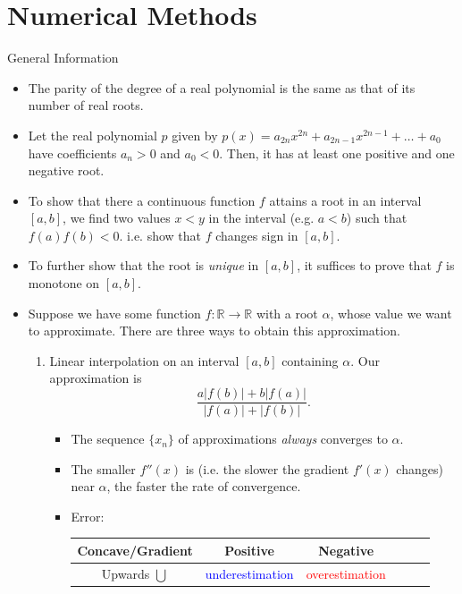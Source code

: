 \documentclass[../Notes.tex]{subfiles}
\begin{document}
\chapter{Numerical Methods}
\begin{stbox}{General Information}
    \begin{itemize}
        \item The parity of the degree of a real polynomial is the same as that of its number of real roots.
        \item Let the real polynomial \(p\) given by \(p(x)=a_{2n}x^{2n}+a_{2n-1}x^{2n-1}+\dots+a_0\) have coefficients \(a_n>0\) and \(a_0<0\). Then, it has at least one positive and one negative root.
        \item To show that there a continuous function \(f\) attains a root in an interval \([a,b]\), we find two values \(x<y\) in the interval (e.g. \(a<b\)) such that \(f(a)f(b)<0\). i.e. show that \(f\) changes sign in \([a,b]\).
        \item To further show that the root is \emph{unique} in \([a,b]\), it suffices to prove that \(f\) is monotone on \([a,b]\).
        \item Suppose we have some function \(f \colon \mathbb{R}\to \mathbb{R}\) with a root \(\alpha\), whose value we want to approximate. There are three ways to obtain this approximation.
        \begin{enumerate}
            \item Linear interpolation on an interval \([a,b]\) containing \(\alpha\). Our approximation is
            \[\frac{a \lvert f(b) \rvert+b \lvert f(a) \rvert}{\lvert f(a) \rvert+\lvert f(b) \rvert}.\]
            \begin{itemize}
                \item The sequence \(\{x_n\}\) of approximations \emph{always} converges to \(\alpha\).
                \item The smaller \(f''(x)\) is (i.e. the slower the gradient \(f'(x)\) changes) near \(\alpha\), the faster the rate of convergence.
                \item Error:
                \begin{table}[H]
                    \centering
                    \begin{tabular}{|Sc|Sc|Sc|}
                        \hline
                        Concave/Gradient & Positive & Negative\\
                        \hline
                        Upwards \(\bigcup\) & \textcolor{blue}{underestimation} & \textcolor{red}{overestimation}\\

\end{tabular}
\end{table}
\end{itemize}
\end{enumerate}
\end{itemize}
\end{stbox}
\end{document}
